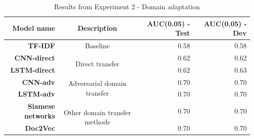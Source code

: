 \documentclass{sigkddExp}
\begin{document}
\begin{table}[h]
    \begin{tabular}{r | c | r | r}
    \toprule
    \toprule
    \textbf{Model name}
    & \textbf{Description}
    & \textbf{AUC(0.05) - Test}
    & \textbf{AUC(0.05) - Dev}
    \\
    \toprule
    \textbf{TF-IDF}
    & Baseline
    & 0.58
    & 0.58
    \\
    \cmidrule{1-4} 
    \textbf{CNN-direct}
    & \multirow{2}{*}{Direct transfer}
    & 0.62
    & 0.62
    \\
    \cmidrule{1-1} 
    \cmidrule{3-4} 
    \textbf{LSTM-direct}
    & 
    & 0.62
    & 0.63
    \\
    \midrule
    \textbf{CNN-adv}
    & \multirow{2}{*}{Adversarial domain transfer}
    & 0.70
    & 0.70
    \\
    \cmidrule{1-1} 
    \cmidrule{3-4}
    \textbf{LSTM-adv}
    &
    & 0.70
    & 0.70
    \\
    \midrule
    \textbf{Siamese networks}
    & \multirow{2}{*}{Other domain transfer methods}
    & 0.70
    & 0.70
    \\
    \cmidrule{1-1} 
    \cmidrule{3-4}
    \textbf{\textsf{Doc2Vec}}
    &
    & 0.70
    & 0.70
    \\
    \bottomrule
    \end{tabular}
    \caption{Results from Experiment 2 - Domain adaptation}
\end{table}
\end{document}

